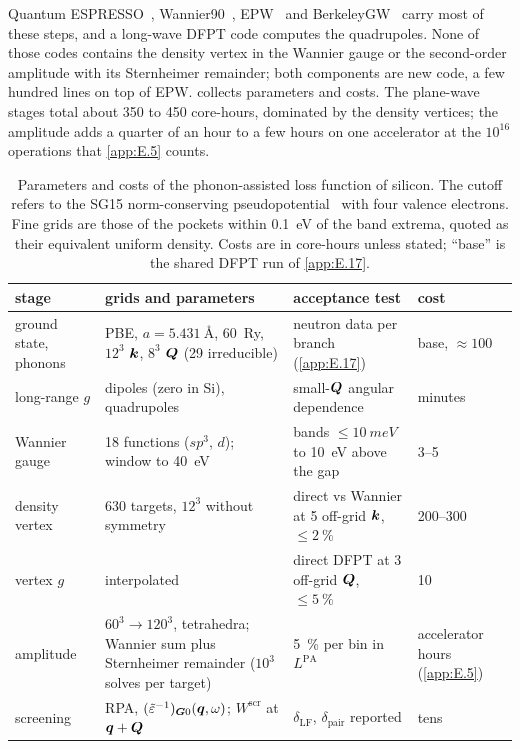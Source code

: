 Quantum ESPRESSO~\cite{giannozzi2017advanced}, Wannier90~\cite{pizzi2020wannier90}, EPW~\cite{ponce2016epw} and BerkeleyGW~\cite{deslippe2012berkeleygw} carry most of these steps, and a long-wave DFPT code computes the quadrupoles. None of those codes contains the density vertex in the Wannier gauge or the second-order amplitude with its Sternheimer remainder; both components are new code, a few hundred lines on top of EPW.  collects parameters and costs. The plane-wave stages total about 350 to 450 core-hours, dominated by the density vertices; the amplitude adds a quarter of an hour to a few hours on one accelerator at the $10^{16}$ operations that \cref{app:E.5} counts.

\begin{table}[t]
  \centering
  \caption{Parameters and costs of the phonon-assisted loss function of silicon. The cutoff refers to the SG15 norm-conserving pseudopotential~\cite{schlipf2015optimization} with four valence electrons. Fine grids are those of the pockets within \SI{0.1}{eV} of the band extrema, quoted as their equivalent uniform density. Costs are in core-hours unless stated; ``base'' is the shared DFPT run of \cref{app:E.17}.}
  \label{tab:E14-params}
  \small
  \setlength{\tabcolsep}{4pt}
  \begin{tabular}{p{}p{}p{}p{}}
    \toprule
    stage & grids and parameters & acceptance test & cost \\
    \midrule
    ground state, phonons & PBE, $a = \SI{5.431}{\angstrom}$, \SI{60}{Ry}, $12^3$ $\bm{k}$, $8^3$ $\bm{Q}$ (29 irreducible) & neutron data per branch (\cref{app:E.17}) & base, $\approx 100$ \\
    long-range $g$ & dipoles (zero in Si), quadrupoles & small-$\bm{Q}$ angular dependence & minutes \\
    Wannier gauge & 18 functions ($sp^3$, $d$); window to \SI{40}{eV} & bands $\le\SI{10}{meV}$ to \SI{10}{eV} above the gap & 3--5 \\
    density vertex & 630 targets, $12^3$ without symmetry & direct vs Wannier at 5 off-grid $\bm{k}$, $\le\SI{2}{\percent}$ & 200--300 \\
    vertex $g$ & interpolated & direct DFPT at 3 off-grid $\bm{Q}$, $\le\SI{5}{\percent}$ & 10 \\
    amplitude & $60^3 \to 120^3$, tetrahedra; Wannier sum plus Sternheimer remainder ($10^3$ solves per target) & \SI{5}{\percent} per bin in $L^{\mathrm{PA}}$ & accelerator hours (\cref{app:E.5}) \\
    screening & RPA, $(\tilde\varepsilon^{-1})_{\bm{G}0}(\bm{q},\omega)$; $W^{\mathrm{scr}}$ at $\bm{q}+\bm{Q}$ & $\delta_{\mathrm{LF}}$, $\delta_{\mathrm{pair}}$ reported & tens \\
    \bottomrule
  \end{tabular}
\end{table}

